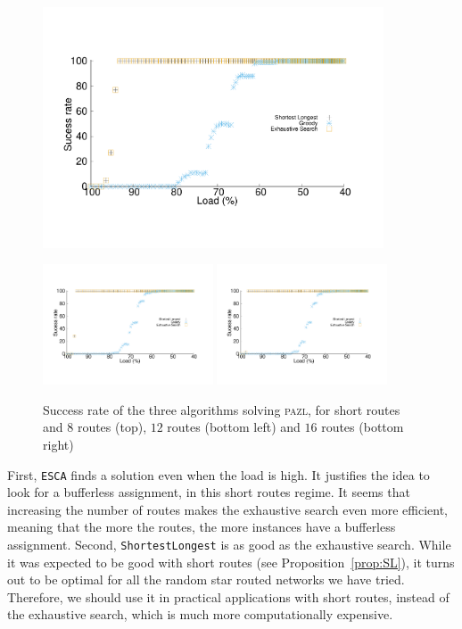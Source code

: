 \documentclass[a4paper,10pt]{journal}
\newcommand\shortestlongest{\texttt{ShortestLongest}\xspace}
\newcommand\ESCA{\texttt{ESCA}\xspace}
\newcommand\pazl{\textsc{pazl}\xspace}
\begin{document}
      \begin{figure}[h]
      \begin{center}
	 \includegraphics[width=0.9\textwidth]{pazlshort8.pdf}
\vspace{1cm}

	 \includegraphics[width=0.45\textwidth]{pazlshort12.pdf}
	 \includegraphics[width=0.45\textwidth]{pazlshort16.pdf}
      \end{center}
      \caption{Success rate of the three algorithms solving \pazl, for short routes and $8$ routes (top), $12$ routes (bottom left) and $16$ routes (bottom right)}\label{fig:short}
      \end{figure}

      First, \ESCA finds a solution even when the load is high. It justifies the idea to look for a bufferless assignment, in this short routes regime. 
      It seems that increasing the number of routes makes the exhaustive search even more efficient, meaning that the more the routes, the more instances have a bufferless assignment. 
      Second, \shortestlongest is as good as the exhaustive search. While it was expected to be good with short routes (see Proposition~\ref{prop:SL}), it turns out to be optimal for all the random star routed networks we have tried. Therefore, we should use it in practical applications with short routes, instead of the exhaustive search, which is much more computationally expensive. 
\end{document}
